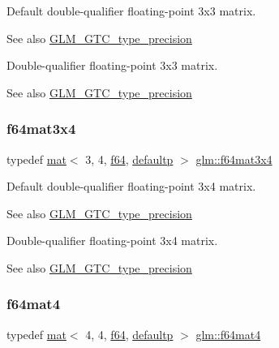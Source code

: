 Default double-\/qualifier floating-\/point 3x3 matrix. \begin{DoxySeeAlso}{See also}
\mbox{\hyperlink{group__gtc__type__precision}{G\+L\+M\+\_\+\+G\+T\+C\+\_\+type\+\_\+precision}}
\end{DoxySeeAlso}
Double-\/qualifier floating-\/point 3x3 matrix. \begin{DoxySeeAlso}{See also}
\mbox{\hyperlink{group__gtc__type__precision}{G\+L\+M\+\_\+\+G\+T\+C\+\_\+type\+\_\+precision}} 
\end{DoxySeeAlso}
\mbox{\label{group__gtc__type__precision_gaddb7f46e5a007c31348305de542e0d52}} 
\subsubsection{\texorpdfstring{f64mat3x4}{f64mat3x4}}
{\footnotesize\ttfamily typedef \mbox{\hyperlink{structglm_1_1mat}{mat}}$<$ 3, 4, \mbox{\hyperlink{group__gtc__type__precision_ga2bba392e555124b36cde6abba349bab3}{f64}}, \mbox{\hyperlink{namespaceglm_a36ed105b07c7746804d7fdc7cc90ff25a9d21ccd8b5a009ec7eb7677befc3bf51}{defaultp}} $>$ \mbox{\hyperlink{group__gtc__type__precision_gaddb7f46e5a007c31348305de542e0d52}{glm\+::f64mat3x4}}}

Default double-\/qualifier floating-\/point 3x4 matrix. \begin{DoxySeeAlso}{See also}
\mbox{\hyperlink{group__gtc__type__precision}{G\+L\+M\+\_\+\+G\+T\+C\+\_\+type\+\_\+precision}}
\end{DoxySeeAlso}
Double-\/qualifier floating-\/point 3x4 matrix. \begin{DoxySeeAlso}{See also}
\mbox{\hyperlink{group__gtc__type__precision}{G\+L\+M\+\_\+\+G\+T\+C\+\_\+type\+\_\+precision}} 
\end{DoxySeeAlso}
\mbox{\label{group__gtc__type__precision_ga9dfc41169318c3a9ca532e087c7641e9}} 
\subsubsection{\texorpdfstring{f64mat4}{f64mat4}}
{\footnotesize\ttfamily typedef \mbox{\hyperlink{structglm_1_1mat}{mat}}$<$ 4, 4, \mbox{\hyperlink{group__gtc__type__precision_ga2bba392e555124b36cde6abba349bab3}{f64}}, \mbox{\hyperlink{namespaceglm_a36ed105b07c7746804d7fdc7cc90ff25a9d21ccd8b5a009ec7eb7677befc3bf51}{defaultp}} $>$ \mbox{\hyperlink{group__gtc__type__precision_ga9dfc41169318c3a9ca532e087c7641e9}{glm\+::f64mat4}}}

